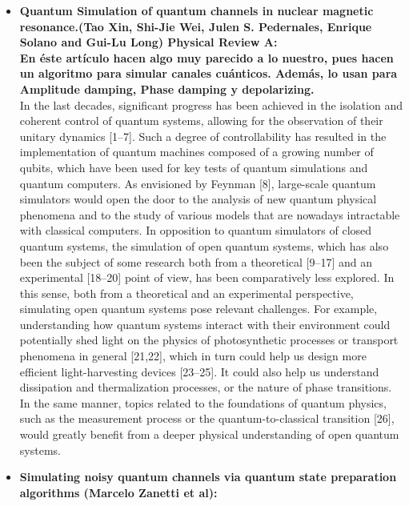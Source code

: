 \documentclass[10pt,letterpaper]{article} %
\begin{document}
\begin{itemize}
\item \textbf{Quantum Simulation of quantum channels in nuclear magnetic resonance.(Tao Xin, Shi-Jie Wei, Julen S. Pedernales, Enrique Solano and Gui-Lu Long) Physical Review A: }\\

\textbf{En éste artículo hacen algo muy parecido a lo nuestro, pues hacen un algoritmo para simular canales cuánticos. Además, lo usan para Amplitude damping, Phase damping y depolarizing.}\\

In the last decades, significant progress has been achieved in
the isolation and coherent control of quantum systems, allowing for the observation of their unitary dynamics [1–7].
{\color{orange} Such a
degree of controllability has resulted in the implementation of
quantum machines composed of a growing number of qubits,
which have been used for key tests of quantum simulations
and quantum computers. As envisioned by Feynman [8],
large-scale quantum simulators would open the door to the
analysis of new quantum physical phenomena and to the
study of various models that are nowadays intractable with
classical computers.}
{\color{green} In opposition to quantum simulators of
closed quantum systems, the simulation of open quantum
systems, which has also been the subject of some research
both from a theoretical [9–17] and an experimental [18–20]
point of view, has been comparatively less explored. } In this
sense, both from a theoretical and an experimental perspective,
simulating open quantum systems pose relevant challenges.
For example, understanding how quantum systems interact
with their environment could potentially shed light on the
physics of photosynthetic processes or transport phenomena
in general [21,22], which in turn could help us design more
efficient light-harvesting devices [23–25]. It could also help
us understand dissipation and thermalization processes, or
the nature of phase transitions. In the same manner, topics
related to the foundations of quantum physics, such as the measurement process or the quantum-to-classical transition [26],
would greatly benefit from a deeper physical understanding of
open quantum systems. \\



\item \textbf{Simulating noisy quantum channels via quantum state preparation algorithms (Marcelo Zanetti et al):} \\


\end{itemize}
\end{document}
